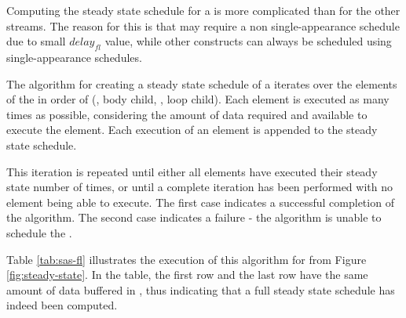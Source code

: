 \begin{comment}
\begin{displaymath}
\begin{array}{rl}
in^i_B = & l_j * u_j - l_B * o_{fl_B} \\
out^i_B = & u^i_{fl_B} + l_B * u_{fl_B} - l_s * o_s\\
in^i_L = & l_s * w_{s, 1} - l_L * o_{fl_L} \\
out^i_L = & delay_{fl} + u^i_{fl_L} + l_L * u_{fl_L} - l_j * w_{j,1} \\
\end{array}
\end{displaymath}
\end{comment}

 Computing the steady
state schedule for a {\feedbackloop} is more complicated than
for the other streams.  The reason for this is that
{\feedbackloops} may require a non single-appearance schedule
due to small $delay_{fl}$ value, while other {\StreamIt}
constructs can always be scheduled using single-appearance
schedules.

\begin{comment}
The algorithm used for creating of a steady state schedule
will work in several phases.  The amount of data present in
{\Channels} between the children of the {\feedbackloop}, the
{\joiner} and the {\splitter} is kept track of to determine which
element is allowed to execute.
\end{comment}

The algorithm for creating a steady state schedule of a
{\feedbackloop} iterates over the elements of the {\feedbackloop}
in order of ({\joiner}, body child, {\splitter}, loop child). Each
element is executed as many times as possible, considering the
amount of data required and available to execute the element. Each
execution of an element is appended to the steady state schedule.

This iteration is repeated until either all elements have executed
their steady state number of times, or until a complete iteration
has been performed with no element being able to execute. The
first case indicates a successful completion of the algorithm. The
second case indicates a failure - the algorithm is unable to
schedule the {\feedbackloop}.

Table \ref{tab:sas-fl} illustrates the execution of this algorithm
for {\feedbackloop} from Figure \ref{fig:steady-state}. In the
table, the first row and the last row have the same amount of data
buffered in {\Channels}, thus indicating that a full steady
state schedule has indeed been computed.
\begin{comment}
Furthermore, the last entry considering execution of $B$ has
sufficient data to execute $B$ 5 times, but only executes it 4
times to ensure that a steady state schedule is constructed.
\end{comment}

